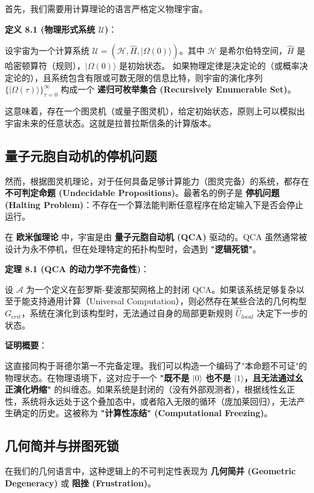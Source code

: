 首先，我们需要用计算理论的语言严格定义物理宇宙。

\textbf{定义 8.1 (物理形式系统 $\mathcal{U}$)}：

设宇宙为一个计算系统 $\mathcal{U} = (\mathcal{H}, \hat{H}, |\Omega(0)\rangle)$。其中 $\mathcal{H}$ 是希尔伯特空间，$\hat{H}$ 是哈密顿算符（规则），$|\Omega(0)\rangle$ 是初始状态。
如果物理定律是决定论的（或概率决定论的），且系统包含有限或可数无限的信息比特，则宇宙的演化序列 $\{ |\Omega(\tau)\rangle \}_{\tau=0}^\infty$ 构成一个 \textbf{递归可枚举集合 (Recursively Enumerable Set)}。

这意味着，存在一个图灵机（或量子图灵机），给定初始状态，原则上可以模拟出宇宙未来的任意状态。这就是拉普拉斯信条的计算版本。

\subsection{量子元胞自动机的停机问题}

然而，根据图灵机理论，对于任何具备足够计算能力（图灵完备）的系统，都存在 \textbf{不可判定命题 (Undecidable Propositions)}。最著名的例子是 \textbf{停机问题 (Halting Problem)}：不存在一个算法能判断任意程序在给定输入下是否会停止运行。

在 \textbf{欧米伽理论} 中，宇宙是由 \textbf{量子元胞自动机 (QCA)} 驱动的。QCA 虽然通常被设计为永不停机，但在处理特定的拓扑构型时，会遇到 \textbf{"逻辑死锁"}。

\textbf{定理 8.1 (QCA 的动力学不完备性)}：

设 $\mathcal{A}$ 为一个定义在彭罗斯-斐波那契网格上的封闭 QCA。如果该系统足够复杂以至于能支持通用计算（Universal Computation），则必然存在某些合法的几何构型 $G_{crit}$，系统在演化到该构型时，无法通过自身的局部更新规则 $\hat{U}_{local}$ 决定下一步的状态。

\textbf{证明概要}：

这直接同构于哥德尔第一不完备定理。我们可以构造一个编码了"本命题不可证"的物理状态。在物理语境下，这对应于一个 \textbf{"既不是 $|0\rangle$ 也不是 $|1\rangle$，且无法通过幺正演化坍缩"} 的纠缠态。如果系统是封闭的（没有外部观测者），根据线性幺正性，系统将永远处于这个叠加态中，或者陷入无限的循环（庞加莱回归），无法产生确定的历史。这被称为 \textbf{"计算性冻结" (Computational Freezing)}。

\subsection{几何简并与拼图死锁}

在我们的几何语言中，这种逻辑上的不可判定性表现为 \textbf{几何简并 (Geometric Degeneracy)} 或 \textbf{阻挫 (Frustration)}。

